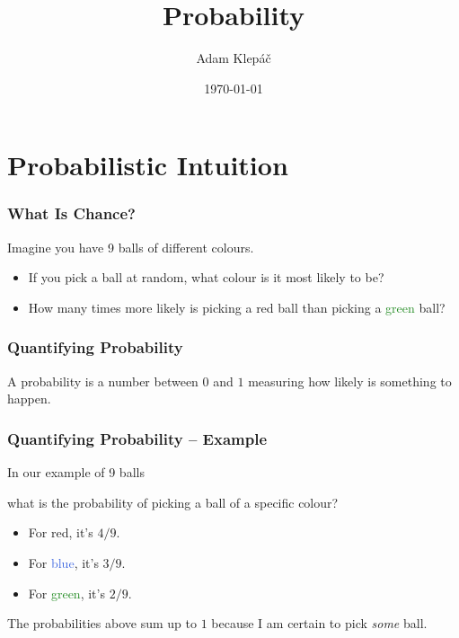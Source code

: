 \documentclass[aspectratio=169,11pt,usenames,dvipsnames]{beamer}
\title{Probability}
\date{\today}
\author{Adam Klepáč}
\institute[GEVO]{Gymnázium Evolution Jižní Město}
\newcommand{\clr}{\textcolor{BrickRed}}
\newcommand{\clb}{\textcolor{RoyalBlue}}
\newcommand{\clg}{\textcolor{ForestGreen}}
\begin{document}
\titleframe

\section{Probabilistic Intuition}
\label{sec:probabilistic-intuition}

\begin{frame}
 \frametitle{What Is Chance?}
 Imagine you have 9 balls of different colours.\pause
 \begin{center}
 \end{center}
 \pause
 \begin{itemize}
  \item If you pick a ball \alert{at random}, what colour is it most likely to
   be?\pause
  \item How many times more likely is picking a \clr{red} ball than picking a
   \clg{green} ball?\pause
 \end{itemize}
\end{frame}

\begin{frame}
 \frametitle{Quantifying Probability}
 \begin{tcolorbox}[title=Probability]
  A \alert{probability} is a number between $0$ and $1$ measuring how
  \alert{likely} is something to happen.
 \end{tcolorbox}
\end{frame}

\begin{frame}
 \frametitle{Quantifying Probability -- Example}
 In our example of 9 balls
 \begin{center}
  \vspace*{-2em}
 \end{center}
 what is the probability of picking a ball of a specific colour?\pause
 \begin{itemize}
  \item For \clr{red}, it's $4 / 9$.
  \item For \clb{blue}, it's $3 / 9$.
  \item For \clg{green}, it's $2 / 9$.
 \end{itemize}\pause
 The probabilities above \alert{sum up to $1$} because I am certain to pick
 \emph{some} ball.
\end{frame}
\end{document}
